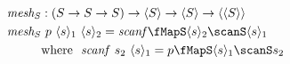 \documentclass[preview]{standalone}
\begin{document}
\begin{align*}%
  \mathit{mesh_S} &: (S \rightarrow S \rightarrow S) \rightarrow \vect{S} \rightarrow \vect{S} \rightarrow \vect{\vect{S}}\\
  \mathit{mesh_S} &\ p\ \vect{s}_1\ \vect{s}_2 = \mathit{scanf} \fMapS \vect{s}_2 \scanS \vect{s}_1 \\
                     &\text{where}\ \ \mathit{scanf}\ s_2\ \vect{s}_1 = p \fMapS \vect{s}_1 \scanS s_2 %
\end{align*}
\end{document}
